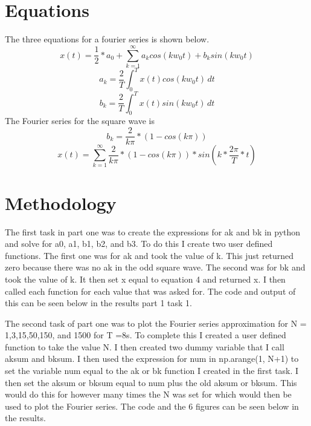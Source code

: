 \documentclass[11pt,a4]{report}
\begin{document}
\section{Equations}
The three equations for a fourier series is shown below.
\begin{equation}
    x(t) = \frac{1}{2}*a_0+  \sum_{k=1}^{\infty} a_kcos(kw_0t) + b_ksin(kw_0t)
\end{equation}
\begin{equation}
    a_k =  \frac{2}{T} \int_{0}^{T} x(t)cos(kw_0t) \,dt 
\end{equation}
\begin{equation}
    b_k =  \frac{2}{T} \int_{0}^{T} x(t)sin(kw_0t) \,dt 
\end{equation}
The Fourier series for the square wave is 
\begin{equation}
    b_k= \frac{2}{k\pi}*(1-cos(k\pi))
\end{equation}
\begin{equation}
    x(t) = \sum_{k=1}^{\infty} \frac{2}{k\pi}*(1-cos(k\pi))*sin(k*\frac{2\pi}{T}*t)
\end{equation}

\section{Methodology}
The first task in part one was to create the expressions for ak and bk in python and solve for a0, a1, b1, b2, and b3. To do this I create two user defined functions. The first one was for ak and took the value of k. This just returned zero because there was no ak in the odd square wave. The second was for bk and took the value of k. It then set x equal to equation 4 and returned x. I then called each function for each value that was asked for. The code and output of this can be seen below in the results part 1 task 1.

The second task of part one was to plot the Fourier series approximation for N = 1,3,15,50,150, and 1500 for T =8s. To complete this I created a user defined function to take the value N. I then created two dummy variable that I call aksum and bksum. I then used the expression for num in np.arange(1, N+1) to set the variable num equal to the ak or bk function I created in the first task. I then set the aksum or bksum equal to num plus the old aksum or bksum. This would do this for however many times the N was set for which would then be used to plot the Fourier series. The code and the 6 figures can be seen below in the results. 
\end{document}
